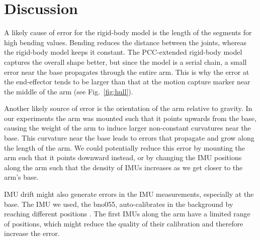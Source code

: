 \section{Discussion} \label{sec:discussion}

A likely cause of error for the rigid-body model is the length of the segments for high bending values. 
Bending reduces the distance between the joints, whereas the rigid-body model keeps it constant.
%
The PCC-extended rigid-body model captures the overall shape better, but since the model is a serial chain, a small error near the base propagates through the entire arm.
This is why the error at the end-effector tends to be larger than that at the motion capture marker near the middle of the arm (see Fig.~\ref{fig:hull}).

Another likely source of error is the orientation of the arm relative to gravity.
In our experiments the arm was mounted such that it points upwards from the base, causing the weight of the arm to induce larger non-constant curvatures near the base.
This curvature near the base leads to errors that propagate and grow along the length of the arm.
We could potentially reduce this error by mounting the arm such that it points downward instead, 
or by changing the IMU positions along the arm such that the density of IMUs increases as we get closer to the arm's base.

IMU drift might also generate errors in the IMU measurements, especially at the base. 
The IMU we used, the bno055, auto-calibrates in the background by reaching different positions \cite{sensortec2016bno055}.
The first IMUs along the arm have a limited range of positions, which might reduce the quality of their calibration and therefore increase the error.

